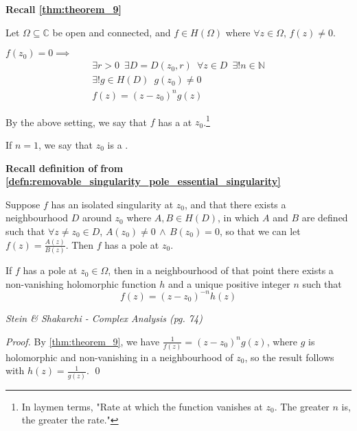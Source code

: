 \documentclass[11pt, oneside]{book}
\begin{document}
\textbf{Recall \cref{thm:theorem_9}}

Let $\Omega \subseteq \mathbb{C}$ be open and connected, and $f \in H(\Omega)$ where $\forall z \in \Omega, \, f(z) \neq 0$.

$f(z_0) = 0 \implies$
\begin{gather*}
	\exists r > 0 \enspace \exists D = D(z_0, r) \enspace \forall z \in D \enspace \exists! n \in \mathbb{N} \\
	\exists! g \in H(D) \enspace g(z_0) \neq 0 \\
	f(z) = (z - z_0)^n g(z)
\end{gather*}

\begin{defn}\label{defn:zero_of_order_n_&_simple_zero}
	By the above setting, we say that $f$ has a  at $z_0$.\footnote{In laymen terms, "Rate at which the function vanishes at $z_0$. The greater $n$ is, the greater the rate."}

	If $n = 1$, we say that $z_0$ is a .
\end{defn}

\textbf{Recall definition of}  \textbf{from \cref{defn:removable_singularity_pole_essential_singularity}}

Suppose $f$ has an isolated singularity at $z_0$, and that there exists a neighbourhood $D$ around $z_0$ where $A, B \in H(D)$, in which $A$ and $B$ are defined such that $\forall z \neq z_0 \in D$, $A(z_0) \neq 0 \, \land \, B(z_0) = 0$, so that we can let $f(z) = \frac{A(z)}{B(z)}$. Then $f$ has a pole at $z_0$.

\begin{thm}[Theorem 9.1]\label{thm:theorem_9.1}
	If $f$ has a pole at $z_0 \in \Omega$, then in a neighbourhood of that point there exists a non-vanishing holomorphic function $h$ and a unique positive integer $n$ such that
	\begin{equation*}
		f(z) = (z - z_0)^{-n} h(z)
	\end{equation*}
\end{thm}

\textit{Stein \& Shakarchi - Complex Analysis (pg. 74)}

\begin{proof}
	By \cref{thm:theorem_9}, we have $\frac{1}{f(z)} = (z - z_0)^n g(z)$, where $g$ is holomorphic and non-vanishing in a neighbourhood of $z_0$, so the result follows with $h(z) = \frac{1}{g(z)}$. \qed
\end{proof}
\end{document}
